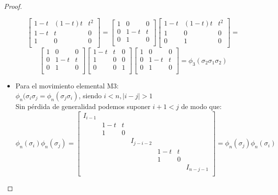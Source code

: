 \documentclass[14pt]{extarticle}
\begin{document}
\begin{proof}
\begin{itemize}
	  	 	\[\begin{bmatrix}
	  	 	1-t& (1-t)t & t^{2}  \\
	  	 	1-t & t & 0 \\
	  	 	1 & 0 & 0 \\
	  	 	\end{bmatrix} = 
	  	 	\begin{bmatrix}
	  	 	1 & 0 & 0 \\
	  	 	0 & 1-t & t \\
	  	 	0 & 1 & 0 \\
	  	 	\end{bmatrix}\begin{bmatrix}
	  	 	1-t & (1-t)t & t^{2}  \\
	  	 	1 & 0 & 0 \\
	  	 	0 & 1 & 0 \\
	  	 	\end{bmatrix}= \]
	  	 	\[\begin{bmatrix}
	  	 	1 & 0 & 0 \\
	  	 	0 & 1-t & t \\
	  	 	0 & 1 & 0 \\
	  	 	\end{bmatrix}\begin{bmatrix}
	  	 	1-t & t & 0  \\
	  	 	1 & 0 & 0 \\
	  	 	0 & 0 & 1 \\
	  	 	\end{bmatrix}\begin{bmatrix}
	  	 	1 & 0 & 0 \\
	  	 	0 & 1-t & t \\
	  	 	0 & 1 & 0 \\
	  	 	\end{bmatrix}= \phi_{3}(\sigma_{2}\sigma_{1}\sigma_{2})\]
	  	 	
	  	 
	 	 \item Para el movimiento elemental M3:\\
	 	 $ \phi_{n}(\sigma_{i}\sigma_{j} = \phi_{n}(\sigma_{j}\sigma_{i})$, siendo $i<n, |i-j| > 1$\\
	 	 Sin pérdida de generalidad podemos suponer $ i+1<j $ de modo que:
	 	 \[ \phi_{n} (\sigma_{i}) \phi_{n} (\sigma_{j}) = \begin{bmatrix}
	 	 I_{i-1} &  &  & \\
	 	 & 1-t & t &  \\
	 	 & 1 & 0 &  \\
	 	 &  &  & I_{j-i-2} \\
	 	 & & & & 1-t & t &  \\
	 	 & & & & 1 & 0 &  \\
	 	 & & & & & & I_{n-j-1}  \\
	 	 \end{bmatrix}= \phi_{n} (\sigma_{j}) \phi_{n} (\sigma_{i})\]
 	 \end{itemize}
 	 

\end{proof}
\end{document}
